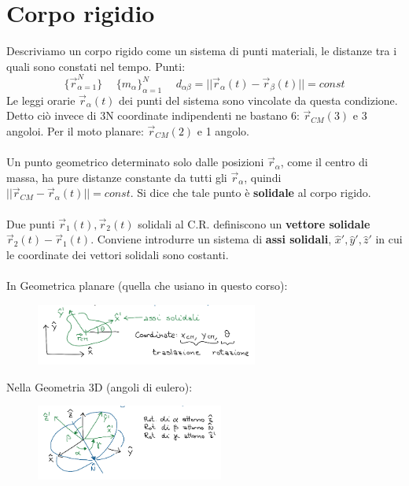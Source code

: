 \newpage
\section{Corpo rigidio}
Descriviamo un corpo rigido come un sistema di punti materiali, le distanze tra
i quali sono constati nel tempo. Punti: 
$$\{\vec{r}_{\alpha=1}^N\} \hspace{15pt} \{m_{\alpha}\}_{\alpha=1}^N \hspace{15pt} d_{\alpha\beta} = ||\vec{r}_{\alpha}(t) - \vec{r}_{\beta}(t)|| = const$$
Le leggi orarie $\vec{r}_{\alpha}(t)$ dei punti del sistema sono vincolate da questa condizione. Detto ciò invece di 3N coordinate indipendenti
ne bastano 6: $\vec{r}_{CM}(3)$ e 3 angoloi. Per il moto planare: $\vec{r}_{CM}(2)$ e 1 angolo.\\\\
Un punto geometrico determinato solo dalle posizioni $\vec{r}_{\alpha}$, come il centro di massa, ha pure distanze constante da tutti gli $\vec{r}_{\alpha}$, quindi $||\vec{r}_{CM} - \vec{r}_{\alpha}(t)|| = const$.
Si dice che tale punto è \textbf{solidale} al corpo rigido.\\\\
Due punti $\vec{r}_1(t), \vec{r}_2(t)$ solidali al C.R. definiscono un \textbf{vettore solidale} $\vec{r}_2(t) - \vec{r}_1(t)$. Conviene introdurre
un sistema di \textbf{assi solidali}, $\hat{x}', \hat{y}', \hat{z}'$ in cui le coordinate dei vettori solidali sono costanti.\\\\
In Geometrica planare (quella che usiano in questo corso):
\begin{figure}[h!]
    \centering
    \includegraphics[width=0.65\textwidth]{images/geo-planare.png}
\end{figure}

\hspace{-15pt}Nella Geometria 3D (angoli di eulero):
\begin{figure}[h!]
    \centering
    \includegraphics[width=0.55\textwidth]{images/geo-3d.png}
\end{figure}

